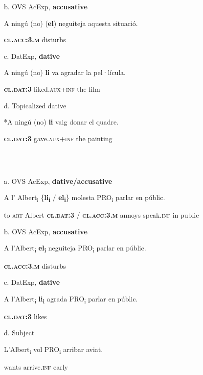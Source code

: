 \documentclass[output=paper,modfonts,nonflat]{langsci/langscibook}
\begin{document}
       b. OVS AcExp, \textbf{accusative}

           A ningú (no) (\textbf{el})                neguiteja aquesta situació.

                                 \textbf{\textsc{cl.acc:3.m}} disturbs

       c. DatExp, \textbf{dative}

           A ningú (no) \textbf{li}              va agradar        la   pel·lícula.

                                \textbf{\textsc{cl.dat:3}} liked.\textsc{aux+inf} the film  

       d. Topicalized dative

           *A ningú (no) \textbf{li}              vaig donar       el   quadre.

                                  \textbf{\textsc{cl.dat:3}} gave.\textsc{aux+inf} the painting

\ea%
    \label{ex:key:12}
    \gll\\
        \\
    \glt
    \z

         a. OVS AcExp, \textbf{dative/accusative}

           A l’     Albert\textsubscript{i} \{\textbf{li\textsubscript{i}}             / \textbf{el\textsubscript{i}}\}               molesta PRO\textsubscript{i} parlar       en públic.

           to \textsc{art} Albert   \textbf{\textsc{cl.dat:3}} / \textbf{\textsc{cl.acc:3.m}} annoys           speak.\textsc{inf} in public

       b. OVS AcExp, \textbf{accusative}

           A l’Albert\textsubscript{i} \textbf{el\textsubscript{i}}                 neguiteja PRO\textsubscript{i} parlar en públic.

                             \textbf{\textsc{cl.acc:3.m}} disturbs

       c. DatExp, \textbf{dative}

           A l’Albert\textsubscript{i} \textbf{li\textsubscript{i}}             agrada PRO\textsubscript{i} parlar en públic.

                            \textbf{\textsc{cl.dat:3}} likes

       d. Subject

           L’Albert\textsubscript{i} vol     PRO\textsubscript{i} arribar      aviat.

                              wants          arrive.\textsc{inf} early
\end{document}
